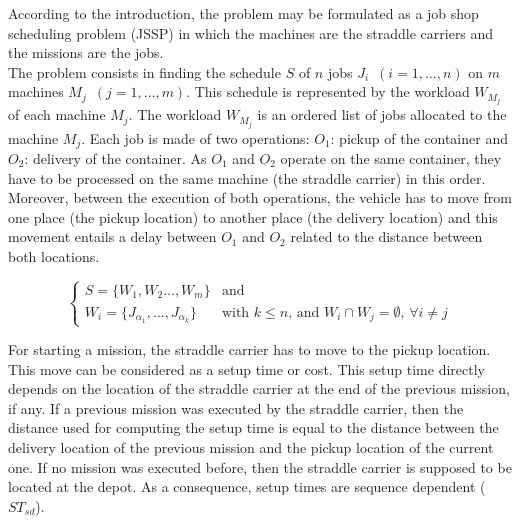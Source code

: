 \documentclass[review]{elsarticle}
\begin{document}

According to the introduction, the problem may be formulated as a job shop scheduling problem (JSSP) in which the machines are the straddle carriers and the missions are the jobs. \\

The problem consists in finding the schedule $S$ of $n$ jobs $J_i$~$(i=1,\ldots,n)$ on $m$ machines $M_j$~$(j=1,\ldots,m)$. This schedule is represented by the workload $W_{M_j}$ of each machine $M_j$. The workload $W_{M_j}$ is an ordered list of jobs allocated to the machine $M_j$. Each job is made of two operations: $O_1$: pickup of the container and $O_2$: delivery of the container. As $O_1$ and $O_2$ operate on the same container, they have to be processed on the same machine (the straddle carrier) in this order. Moreover, between the execution of both operations, the vehicle has to move from one place (the pickup location) to another place (the delivery location) and this movement entails a delay between $O_1$ and $O_2$ related to the distance between both locations.

\begin{equation*}
\begin{cases}
 S = \{ W_{1} , W_{2} \ldots , W_{m}\} & \text{and}\\
 W_{i} = \{ J_{\alpha_1} , \ldots , J_{\alpha_k} \} & \text{with $k \leq n$, and $W_{i} \cap W_{j} = \emptyset$,  $\forall i \neq j$} 
\end{cases}
\end{equation*}
 

For starting a mission, the straddle carrier has to move to the pickup location. This move can be considered as a setup time or cost. This setup time directly depends on the location of the straddle carrier at the end of the previous mission, if any. If a previous mission was executed by the straddle carrier, then the distance used for computing the setup time is equal to the distance between the delivery location of the previous mission and the pickup location of the current one. If no mission was executed before, then the straddle carrier is supposed to be located at the depot. As a consequence, setup times are sequence dependent ($ST_{sd}$). 
\end{document}
